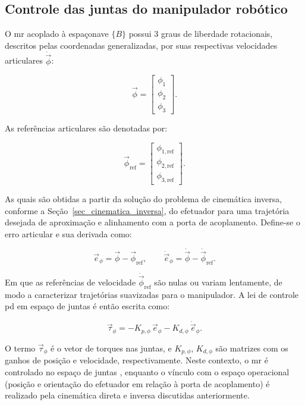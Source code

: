 
\subsection{Controle das juntas do manipulador robótico}
\label{sec_controle_PD_juntas}

O \gls{mr} acoplado à espaçonave $\{B\}$ possui 3 graus de liberdade rotacionais, descritos pelas coordenadas generalizadas, por suas respectivas velocidades articulares $\dot{\vec\phi}$:

\begin{equation}
\vec\phi =
\begin{bmatrix}
\phi_1 \\ \phi_2 \\ \phi_3
\end{bmatrix}.
\end{equation}

As referências articulares são denotadas por:

\begin{equation}
\vec\phi_{\text{ref}} =
\begin{bmatrix}
\phi_{1,\text{ref}} \\
\phi_{2,\text{ref}} \\
\phi_{3,\text{ref}}
\end{bmatrix}.
\end{equation}

As quais são obtidas a partir da solução do problema de cinemática inversa, conforme a Seção~\eqref{sec_cinematica_inversa}, do efetuador para uma trajetória desejada de aproximação e alinhamento com a porta de acoplamento.
Define-se o erro articular e sua derivada como:

\begin{equation}
\vec e_\phi = \vec\phi - \vec\phi_{\text{ref}},
\qquad
\dot{\vec e}_\phi = \dot{\vec\phi} - \dot{\vec\phi}_{\text{ref}}.
\end{equation}

Em que as referências de velocidade $\dot{\vec\phi}_{\text{ref}}$ são nulas ou variam lentamente, de modo a caracterizar trajetórias suavizadas para o manipulador.
A lei de controle \gls{pd} em espaço de juntas é então escrita como:

\begin{equation}
\vec\tau_\phi
=
- K_{p,\phi}\,\vec e_\phi
- K_{d,\phi}\,\dot{\vec e}_\phi.
\label{eq_controle_PD_juntas}
\end{equation}

O termo $\vec\tau_\phi$ é o vetor de torques nas juntas,
e $K_{p,\phi}$, $K_{d,\phi}$ são matrizes com os ganhos de posição e velocidade, respectivamente.
Neste contexto, o \gls{mr} é controlado no espaço de juntas \cite{craig2005}, enquanto o vínculo com o espaço operacional (posição e orientação do efetuador em relação à porta de acoplamento) é realizado pela cinemática direta e inversa discutidas anteriormente.
